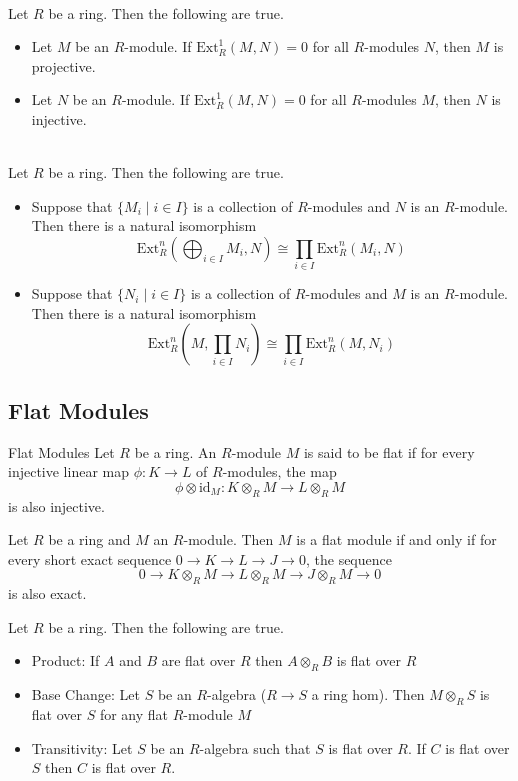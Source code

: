 \documentclass[a4paper]{article}
\begin{document}
\begin{prp}{}{}\\
Let $R$ be a ring. Then the following are true. 
\begin{itemize}
\item Let $M$ be an $R$-module. If $\text{Ext}_R^1(M,N)=0$ for all $R$-modules $N$, then $M$ is projective. 
\item Let $N$ be an $R$-module. If $\text{Ext}_R^1(M,N)=0$ for all $R$-modules $M$, then $N$ is injective. 
\end{itemize}
\end{prp}

\begin{prp}{}{}\\
Let $R$ be a ring. Then the following are true. 
\begin{itemize}
\item Suppose that $\{M_i\;|\;i\in I\}$ is a collection of $R$-modules and $N$ is an $R$-module. Then there is a natural isomorphism $$\text{Ext}_R^n\left(\bigoplus_{i\in I}M_i,N\right)\cong\prod_{i\in I}\text{Ext}_R^n(M_i,N)$$
\item Suppose that $\{N_i\;|\;i\in I\}$ is a collection of $R$-modules and $M$ is an $R$-module. Then there is a natural isomorphism $$\text{Ext}_R^n\left(M,\prod_{i\in I}N_i\right)\cong\prod_{i\in I}\text{Ext}_R^n(M,N_i)$$
\end{itemize}
\end{prp}

\subsection{Flat Modules}
\begin{defn}{Flat Modules}{} Let $R$ be a ring. An $R$-module $M$ is said to be flat if for every injective linear map $\phi:K\to L$ of $R$-modules, the map $$\phi\otimes\text{id}_M:K\otimes_RM\to L\otimes_RM$$ is also injective. 
\end{defn}

\begin{prp}{}{} Let $R$ be a ring and $M$ an $R$-module. Then $M$ is a flat module if and only if for every short exact sequence $0\to K\to L\to J\to 0$, the sequence $$0\to K\otimes_RM\to L\otimes_RM\to J\otimes_RM\to 0$$ is also exact. 
\end{prp}

\begin{prp}{}{} Let $R$ be a ring. Then the following are true. 
\begin{itemize}
\item Product: If $A$ and $B$ are flat over $R$ then $A\otimes_R B$ is flat over $R$
\item Base Change: Let $S$ be an $R$-algebra ($R\to S$ a ring hom). Then $M\otimes_RS$ is flat over $S$ for any flat $R$-module $M$
\item Transitivity: Let $S$ be an $R$-algebra such that $S$ is flat over $R$. If $C$ is flat over $S$ then $C$ is flat over $R$. 
\end{itemize}
\end{prp}
\end{document}

